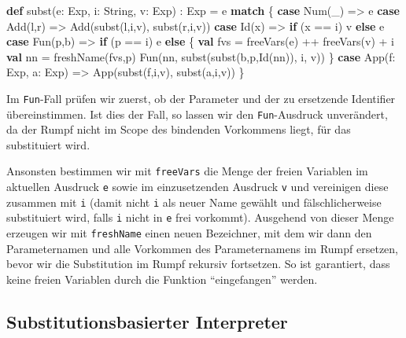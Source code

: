 \documentclass[]{article}
\newenvironment{Shaded}{}{}
\newcommand{\FunctionTok}[1]{\textcolor[rgb]{0.02,0.16,0.49}{#1}}
\newcommand{\KeywordTok}[1]{\textcolor[rgb]{0.00,0.44,0.13}{\textbf{#1}}}
\newcommand{\NormalTok}[1]{#1}
\begin{document}
\begin{Shaded}
\begin{Highlighting}[]
\KeywordTok{def} \FunctionTok{subst}\NormalTok{(e: Exp, i: String, v: Exp) : Exp = e }\KeywordTok{match}\NormalTok{ \{}
  \KeywordTok{case} \FunctionTok{Num}\NormalTok{(\_) =\textgreater{} e}
  \KeywordTok{case} \FunctionTok{Add}\NormalTok{(l,r) =\textgreater{} }\FunctionTok{Add}\NormalTok{(}\FunctionTok{subst}\NormalTok{(l,i,v), }\FunctionTok{subst}\NormalTok{(r,i,v))}
  \KeywordTok{case} \FunctionTok{Id}\NormalTok{(x) =\textgreater{} }\KeywordTok{if}\NormalTok{ (x == i) v }\KeywordTok{else}\NormalTok{ e}
  \KeywordTok{case} \FunctionTok{Fun}\NormalTok{(p,b) =\textgreater{}}
    \KeywordTok{if}\NormalTok{ (p == i) e }\KeywordTok{else}\NormalTok{ \{}
      \KeywordTok{val}\NormalTok{ fvs = }\FunctionTok{freeVars}\NormalTok{(e) ++ }\FunctionTok{freeVars}\NormalTok{(v) + i}
      \KeywordTok{val}\NormalTok{ nn = }\FunctionTok{freshName}\NormalTok{(fvs,p)}
      \FunctionTok{Fun}\NormalTok{(nn, }\FunctionTok{subst}\NormalTok{(}\FunctionTok{subst}\NormalTok{(b,p,}\FunctionTok{Id}\NormalTok{(nn)), i, v))}
\NormalTok{    \}}
  \KeywordTok{case} \FunctionTok{App}\NormalTok{(f: Exp, a: Exp) =\textgreater{} }\FunctionTok{App}\NormalTok{(}\FunctionTok{subst}\NormalTok{(f,i,v), }\FunctionTok{subst}\NormalTok{(a,i,v))}
\NormalTok{\}}
\end{Highlighting}
\end{Shaded}

Im \texttt{Fun}-Fall prüfen wir zuerst, ob der Parameter und der zu
ersetzende Identifier übereinstimmen. Ist dies der Fall, so lassen wir
den \texttt{Fun}-Ausdruck unverändert, da der Rumpf nicht im Scope des
bindenden Vorkommens liegt, für das substituiert wird.

Ansonsten bestimmen wir mit \texttt{freeVars} die Menge der freien
Variablen im aktuellen Ausdruck \texttt{e} sowie im einzusetzenden
Ausdruck \texttt{v} und vereinigen diese zusammen mit \texttt{i} (damit
nicht \texttt{i} als neuer Name gewählt und fälschlicherweise
substituiert wird, falls \texttt{i} nicht in \texttt{e} frei vorkommt).
Ausgehend von dieser Menge erzeugen wir mit \texttt{freshName} einen
neuen Bezeichner, mit dem wir dann den Parameternamen und alle Vorkommen
des Parameternamens im Rumpf ersetzen, bevor wir die Substitution im
Rumpf rekursiv fortsetzen. So ist garantiert, dass keine freien
Variablen durch die Funktion ``eingefangen'' werden.

\hypertarget{substitutionsbasierter-interpreter-a}{%
\subsection{Substitutionsbasierter
Interpreter}\label{substitutionsbasierter-interpreter-a}}
\end{document}
